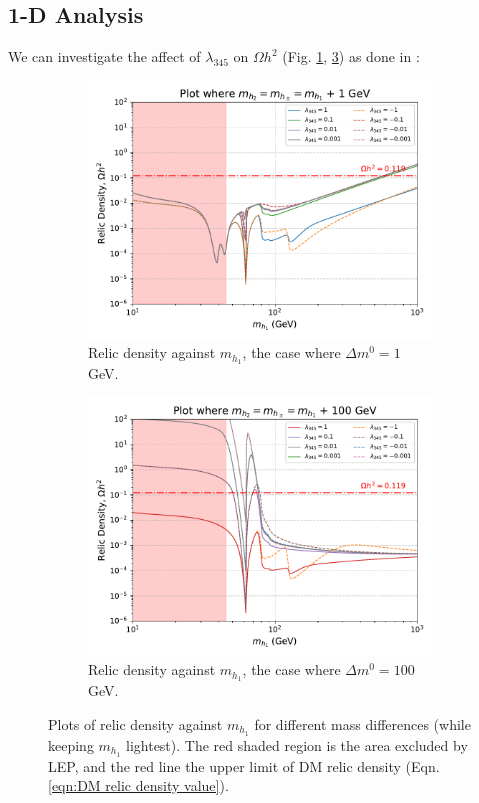 \documentclass[12pt]{article}
\begin{document}
\subsection{1-D Analysis}
\label{1-D scan}
We can investigate the affect of $\lambda_{345}$ on $\Omega h^2$ (Fig. \ref{fig:MD1_l345_1}, \ref{fig:MD1_l345_100}) as done in \cite{Belyaev:2016lok}:
\begin{figure}[H]
    \centering
    \begin{subfigure}[b]{0.49\textwidth}
        \centering
        \includegraphics[width=\textwidth]{plots/plot_MD1_l345+1.pdf}
        \caption{Relic density against $m_{h_1}$, the case where $\Delta m^0 = 1$ GeV.}
        \label{fig:MD1_l345_1}
    \end{subfigure}
    \hfill
    \begin{subfigure}[b]{0.49\textwidth}
        \centering
        \includegraphics[width=\textwidth]{plots/plot_MD1_l345+100.pdf}
        \caption{Relic density against $m_{h_1}$, the case where $\Delta m^0 = 100$ GeV.}
        \label{fig:MD1_l345_100}
    \end{subfigure}
    \caption{Plots of relic density against $m_{h_1}$ for different mass differences (while keeping $m_{h_1}$ lightest). The red shaded region is the area excluded by LEP, and the red line the upper limit of DM relic density (Eqn. \ref{eqn:DM relic density value}).}
\end{figure}
\end{document}
